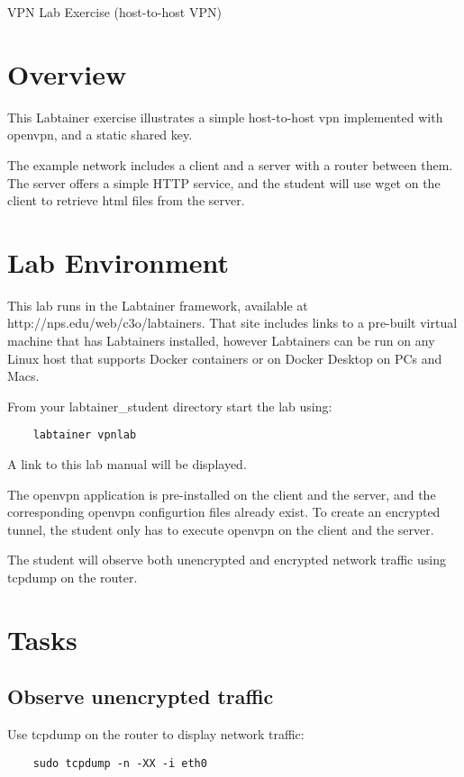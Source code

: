 


\begin{center}
{\LARGE VPN Lab Exercise (host-to-host VPN)}
\vspace{0.1in}\\
\end{center}

\section{Overview}
This Labtainer exercise illustrates a simple
host-to-host vpn implemented with openvpn, and
a static shared key.

The example network includes a client and a 
server with a router between them.  The server
offers a simple HTTP service,  and the student
will use wget on the client to retrieve html
files from the server.

\section{Lab Environment}
This lab runs in the Labtainer framework,
available at http://nps.edu/web/c3o/labtainers.
That site includes links to a pre-built virtual machine
that has Labtainers installed, however Labtainers can
be run on any Linux host that supports Docker containers
or on Docker Desktop on PCs and Macs.

From your labtainer_student directory start the lab using:
\begin{verbatim}
    labtainer vpnlab
\end{verbatim}
A link to this lab manual will be displayed.

The openvpn application is pre-installed
on the client and the server, and the
corresponding openvpn configurtion files
already exist.  To create an encrypted tunnel,
the student only has to execute openvpn on
the client and the server.

The student will observe both unencrypted 
and encrypted network traffic using
tcpdump on the router.

\section{Tasks}

\subsection{Observe unencrypted traffic}
Use tcpdump on the router to display network traffic:
\begin{verbatim}
    sudo tcpdump -n -XX -i eth0
\end{verbatim}

